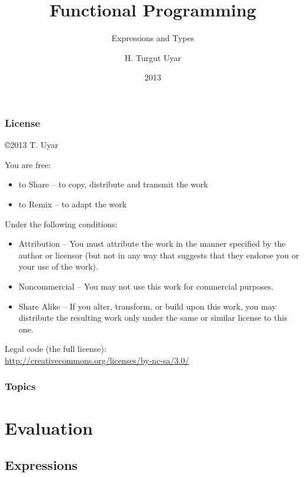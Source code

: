 \documentclass[dvipsnames]{beamer}
\title{Functional Programming}
\subtitle{Expressions and Types}
\author{H. Turgut Uyar}
\date{2013}
\theoremstyle{plain}
\begin{document}
\begin{frame}
  \titlepage
\end{frame}

\begin{frame}
  \frametitle{License}

  \hfill
  \copyright 2013 T. Uyar

  \vfill
  \begin{tiny}
    You are free:
    \begin{itemize}
      \item to Share -- to copy, distribute and transmit the work
      \item to Remix -- to adapt the work
    \end{itemize}

    Under the following conditions:
    \begin{itemize}
      \item Attribution -- You must attribute the work in the manner specified by
        the author or licensor (but not in any way that suggests that they
        endorse you or your use of the work).

      \item Noncommercial -- You may not use this work for commercial purposes.

      \item Share Alike -- If you alter, transform, or build upon this work, you
        may distribute the resulting work only under the same or similar license
        to this one.
    \end{itemize}
  \end{tiny}

  \vfill
  Legal code (the full license):\\
  \url{http://creativecommons.org/licenses/by-nc-sa/3.0/}
\end{frame}

\begin{frame}
  \frametitle{Topics}
  \tableofcontents
\end{frame}

\section{Evaluation}

\subsection{Expressions}
\end{document}
